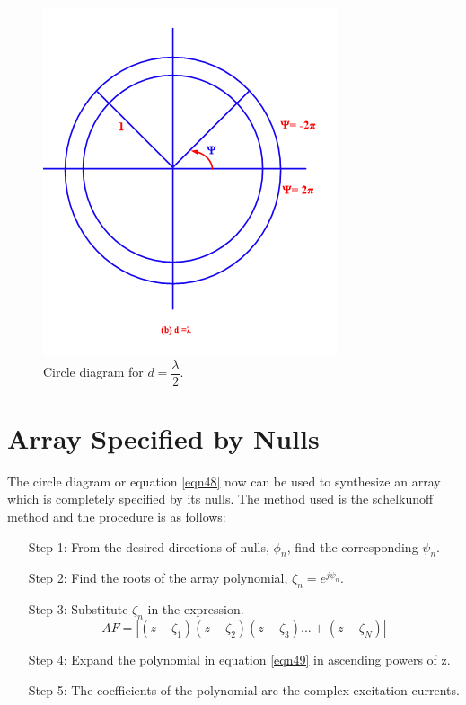 \begin{figure}[h]
\begin{minipage}[b]{0.4\textwidth}
\includegraphics[width=1\linewidth]{"./graphics/fig 55_4b"}
\caption{Circle diagram for $d=\dfrac{\lambda}{2}$.}
\label{fig:fig-55_4a}
\end{minipage}
\end{figure}

\section{Array Specified by Nulls}
The circle diagram or equation \ref{eqn48} now can be used to synthesize an array which is completely specified by its nulls. The method used is the schelkunoff method and the procedure is as follows: 

\begin{enumerate}
\item[Step 1:] From the desired directions of nulls, $\phi_{n}$, find the corresponding $\psi_{n}$.
\item[Step 2:] Find the roots of the array polynomial, $\zeta
_n = e^{j\psi_{n}}$.
\item[Step 3:] Substitute $\zeta_n$ in the expression.
\begin{equation}
AF=|(z-\zeta_1)(z-\zeta_2)(z-\zeta_3)...+(z-\zeta_N)|
\label{eqn49}
\end{equation}
\item[Step 4:] Expand the polynomial in equation \ref{eqn49} in ascending powers of z.
\item[Step 5:] The coefficients of the polynomial are the complex excitation currents.
\end{enumerate}

